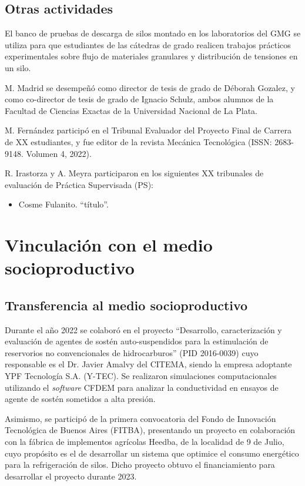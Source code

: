 \documentclass[a4paper,11pt,twoside,final,titlepage,onecolumn,openright]{report}
\begin{document}
\section{Otras actividades}

El banco de pruebas de descarga de silos montado en los laboratorios del GMG se utiliza para que estudiantes de las cátedras de grado realicen trabajos prácticos experimentales sobre flujo de materiales granulares y distribución de tensiones en un silo. 

M. Madrid se desempeñó como director de tesis de grado de Déborah Gozalez, y como co-director de tesis de grado de Ignacio Schulz, ambos alumnos de la Facultad de Ciencias Exactas de la Universidad Nacional de La Plata.

M. Fernández participó en el Tribunal Evaluador del Proyecto Final de Carrera de {\color{red}XX} estudiantes, y fue editor de la revista Mecánica Tecnológica (ISSN: 2683- 9148. Volumen 4, 2022). 

R. Irastorza y A. Meyra participaron en los siguientes {\color{red}XX} tribunales de evaluación de Práctica Supervisada (PS):
\begin{itemize}
    \item {\color{red} Cosme Fulanito. ``título''}.
\end{itemize}



\chapter{Vinculación con el medio socioproductivo}

\section{Transferencia al medio socioproductivo}

Durante el año 2022 se colaboró en el proyecto ``Desarrollo, caracterización y evaluación de agentes de sostén auto-suspendidos para la estimulación de reservorios no convencionales de hidrocarburos'' (PID 2016-0039) cuyo responsable es el Dr. Javier Amalvy del CITEMA, siendo la empresa adoptante YPF Tecnología S.A. (Y-TEC). Se realizaron simulaciones computacionales utilizando el \textit{software} CFDEM para analizar la conductividad en ensayos de agente de sostén sometidos a alta presión.

Asimismo, se participó de la primera convocatoria del Fondo de Innovación Tecnológica de Buenos Aires (FITBA), presentando un proyecto en colaboración con la fábrica de implementos agrícolas Heedba, de la localidad de 9 de Julio, cuyo propósito es el de desarrollar un sistema que optimice el consumo energético para la refrigeración de silos. Dicho proyecto obtuvo el financiamiento para desarrollar el proyecto durante 2023.
\end{document}
